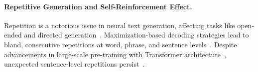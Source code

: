 \documentclass{article} %
\begin{document}




\paragraph{Repetitive Generation and Self-Reinforcement Effect.}

Repetition is a notorious issue in neural text generation, affecting tasks like open-ended and directed generation~\citep{holtzman2019curious,welleck2019neural,lin2021straight,see2017get,liu2019text}. Maximization-based decoding strategies lead to bland, consecutive repetitions at word, phrase, and sentence levels~\citep{holtzman2019curious,welleck2019neural,li2016simple,karpathy2015deep,guan2021long}. Despite advancements in large-scale pre-training with Transformer architecture~\citep{vaswani2017attention,radford2019language,lewis2020bart}, unexpected sentence-level repetitions persist~\citep{radford2019language, brown2020language, fu2020theoretical}. 
\end{document}
